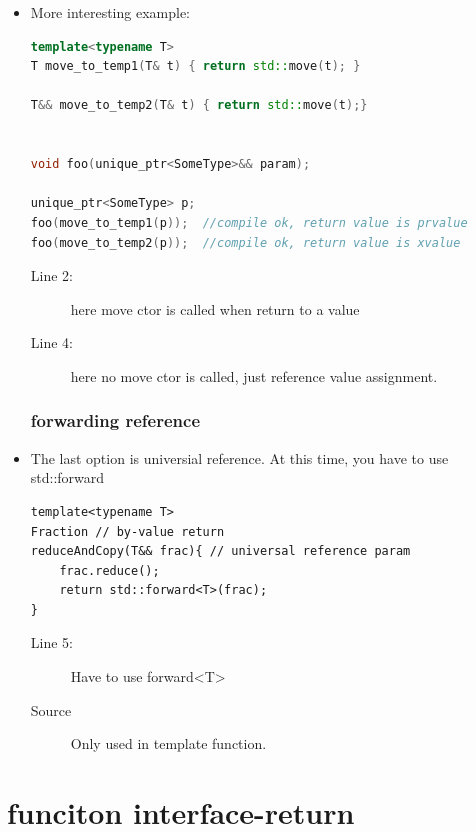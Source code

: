 \documentclass[a4paper,11pt,twoside]{book}
\begin{document}
\begin{itemize}
\item More interesting example:
\begin{lstlisting}[frame=single, language=c++]
template<typename T>
T move_to_temp1(T& t) { return std::move(t); }

T&& move_to_temp2(T& t) { return std::move(t);}


void foo(unique_ptr<SomeType>&& param);

unique_ptr<SomeType> p;
foo(move_to_temp1(p));  //compile ok, return value is prvalue
foo(move_to_temp2(p));  //compile ok, return value is xvalue
\end{lstlisting}
\begin{description}
	\item[Line 2:] here move ctor is called when return to a value
	\item[Line 4:] here no move ctor is called, just reference value assignment.
\end{description}


\subsubsection{forwarding reference}

\item The last option is universial reference. At this time, you have to use std::forward 
\begin{lstlisting}[numbers=none]
template<typename T>
Fraction // by-value return
reduceAndCopy(T&& frac){ // universal reference param
	frac.reduce();
	return std::forward<T>(frac); 
} 
\end{lstlisting}
\begin{description}
	\item[Line 5:] Have to use forward<T>
	\item[Source] Only used in template function.
\end{description}

\end{itemize}

\section{funciton interface-return}
\end{document}
